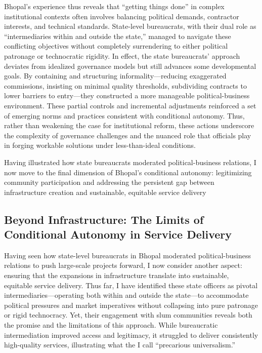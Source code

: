 Bhopal’s experience thus reveals that “getting things done” in complex institutional contexts often involves balancing political demands, contractor interests, and technical standards. State-level bureaucrats, with their dual role as “intermediaries within and outside the state,” managed to navigate these conflicting objectives without completely surrendering to either political patronage or technocratic rigidity. In effect, the state bureaucrats’ approach deviates from idealized governance models but still advances some developmental goals. By containing and structuring informality—reducing exaggerated commissions, insisting on minimal quality thresholds, subdividing contracts to lower barriers to entry—they constructed a more manageable political-business environment. These partial controls and incremental adjustments reinforced a set of emerging norms and practices consistent with conditional autonomy. Thus, rather than weakening the case for institutional reform, these actions underscore the complexity of governance challenges and the nuanced role that officials play in forging workable solutions under less-than-ideal conditions.

Having illustrated how state bureaucrats moderated political-business relations, I now move to the final dimension of Bhopal’s conditional autonomy: legitimizing community participation and addressing the persistent gap between infrastructure creation and sustainable, equitable service delivery

\subsection{Beyond Infrastructure: The Limits of Conditional Autonomy in Service Delivery}

Having seen how state-level bureaucrats in Bhopal moderated political-business relations to push large-scale projects forward, I now consider another aspect: ensuring that the expansions in infrastructure translate into sustainable, equitable service delivery. Thus far, I have identified these state officers as pivotal intermediaries—operating both within and outside the state—to accommodate political pressures and market imperatives without collapsing into pure patronage or rigid technocracy. Yet, their engagement with slum communities reveals both the promise and the limitations of this approach. While bureaucratic intermediation improved access and legitimacy, it struggled to deliver consistently high-quality services, illustrating what the I call “precarious universalism.”

